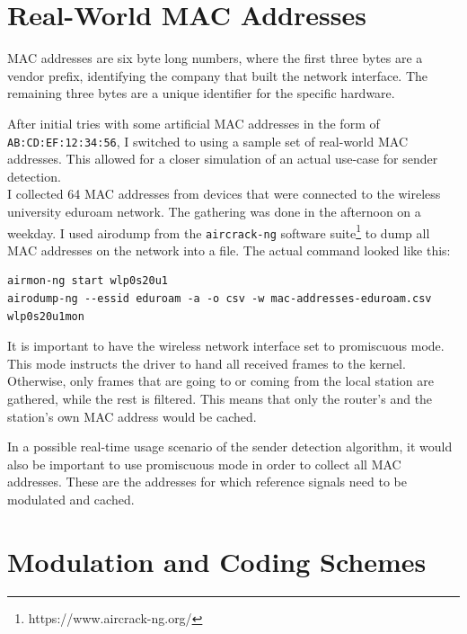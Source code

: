 \section{Real-World MAC Addresses}\label{sec:real-world-macs}

\gls{MAC} addresses are six byte long numbers, where the first three bytes are a vendor prefix, identifying the company that built the network interface. The remaining three bytes are a unique identifier for the specific hardware.

After initial tries with some artificial \gls{MAC} addresses in the form of \texttt{AB:CD:EF:12:34:56}, I switched to using a sample set of real-world \gls{MAC} addresses. This allowed for a closer simulation of an actual use-case for sender detection.\\

I collected 64 \gls{MAC} addresses from devices that were connected to the wireless university eduroam network. The gathering was done in the afternoon on a weekday. I used airodump from the \texttt{aircrack-ng} software suite\footnote{https://www.aircrack-ng.org/} to dump all \gls{MAC} addresses on the network into a file. The actual command looked like this:

\begin{lstlisting}[captionpos=b,caption={Capture Real-World MAC Addresses},label=lst:airodump]
airmon-ng start wlp0s20u1
airodump-ng --essid eduroam -a -o csv -w mac-addresses-eduroam.csv wlp0s20u1mon
\end{lstlisting}

It is important to have the wireless network interface set to promiscuous mode. This mode instructs the driver to hand all received frames to the kernel. Otherwise, only frames that are going to or coming from the local station are gathered, while the rest is filtered. This means that only the router's and the station's own \gls{MAC} address would be cached.

In a possible real-time usage scenario of the sender detection algorithm, it would also be important to use promiscuous mode in order to collect all \gls{MAC} addresses. These are the addresses for which reference signals need to be modulated and cached.



\section{Modulation and Coding Schemes}\label{sec:ex-mcs}

